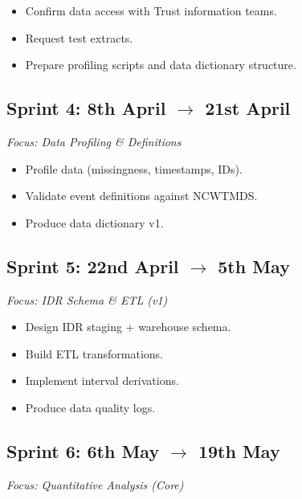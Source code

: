 \documentclass[12pt, a4paper, twoside]{article} %
\begin{document}
\begin{itemize}
  \item[$\square$] Confirm data access with Trust information teams.
  \item[$\square$] Request test extracts.
  \item[$\square$] Prepare profiling scripts and data dictionary structure.
\end{itemize}


\subsection{Sprint 4: 8th April $\rightarrow$ 21st April}
\emph{Focus: Data Profiling \& Definitions}

\begin{itemize}
  \item[$\square$] Profile data (missingness, timestamps, IDs).
  \item[$\square$] Validate event definitions against NCWTMDS.
  \item[$\square$] Produce data dictionary v1.
\end{itemize}


\subsection{Sprint 5: 22nd April $\rightarrow$ 5th May}
\emph{Focus: IDR Schema \& ETL (v1)}

\begin{itemize}
  \item[$\square$] Design IDR staging + warehouse schema.
  \item[$\square$] Build ETL transformations.
  \item[$\square$] Implement interval derivations.
  \item[$\square$] Produce data quality logs.
\end{itemize}


\subsection{Sprint 6: 6th May $\rightarrow$ 19th May}
\emph{Focus: Quantitative Analysis (Core)}
\end{document}
